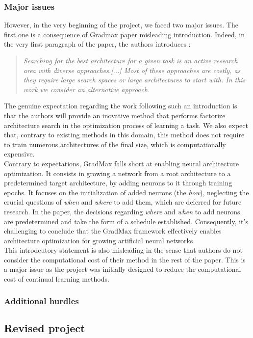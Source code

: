 \documentclass{article}
\begin{document}
\subsubsection{Major issues}

However, in the very beginning of the project, we faced two major issues. The first one is a consequence of Gradmax paper misleading introduction. Indeed, in the very first paragraph of the paper, the authors introduces :
\begin{quote}
    \itshape
    Searching for the best architecture for a given task is an active research area with diverse approaches.[...] Most of these approaches are costly, as they require large search spaces or large architectures to start with. In this work we consider an alternative approach.
\end{quote}
The genuine expectation regarding the work following such an introduction is that the authors will provide an inovative method that performs factorize architecture search in the optimization process of learning a task. We also expect that, contrary to existing methods in this domain, this method does not require to train numerous architectures of the final size, which is computationally expensive.\\

\noindent
Contrary to expectations, GradMax falls short at enabling neural architecture optimization. It consists in growing a network from a root architecture to a predetermined target architecture, by adding neurons to it through training epochs. It focuses on the initialization of added neurons (the \textit{how}), neglecting the crucial questions of \textit{when} and \textit{where} to add them, which are deferred for future research. In the paper, the decisions regarding \textit{where} and \textit{when} to add neurons are predetermined and take the form of a schedule established. Consequently, it's challenging to conclude that the GradMax framework effectively enables architecture optimization for growing artificial neural networks.\\

\noindent
This introdcutory statement is also misleading in the sense that authors do not consider the computational cost of their method in the rest of the paper. This is a major issue as the project was initially designed to reduce the computational cost of continual learning methods.

\subsubsection{Additional hurdles}

\subsection{Revised project}

\nocite{*}
\printbibliography
\end{document}
